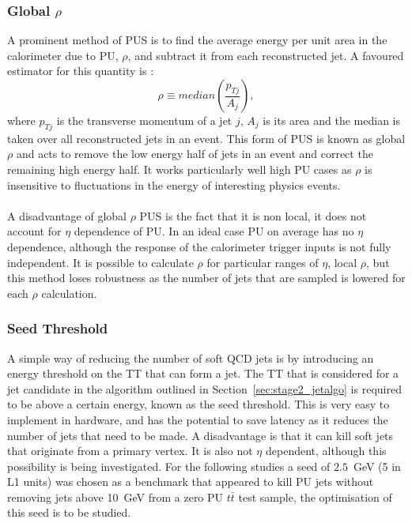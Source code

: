 \subsubsection{Global \boldmath $\rho$}
A prominent method of PUS is to find the average energy per unit area in the calorimeter due to PU, $\rho$, and subtract it from each reconstructed jet. A favoured estimator for this quantity is \cite{global_rho}:
\begin{equation}
\rho\equiv median(\frac{p_{Tj}}{A_j}),
\end{equation}
where $p_{Tj}$ is the transverse momentum of a jet $j$, $A_j$ is its area and the median is taken over all reconstructed jets in an event. This form of PUS is known as global $\rho$ and acts to remove the low energy half of jets in an event and correct the remaining high energy half. It works particularly well high PU cases as $\rho$ is insensitive to fluctuations in the energy of interesting physics events. 
\\\\
A disadvantage of global $\rho$ PUS is the fact that it is non local, it does not account for $\eta$ dependence of PU. In an ideal case PU on average has no $\eta$ dependence, although the response of the calorimeter trigger inputs is not fully independent. It is possible to calculate $\rho$ for particular ranges of $\eta$, local $\rho$, but this method loses robustness as the number of jets that are sampled is lowered for each $\rho$ calculation. 

\subsubsection{Seed Threshold}
A simple way of reducing the number of soft QCD jets is by introducing an energy threshold on the TT that can form a jet. The TT that is considered for a jet candidate in the algorithm outlined in Section~\ref{sec:stage2_jetalgo} is required to be above a certain energy, known as the seed threshold. This is very easy to implement in hardware, and has the potential to save latency as it reduces the number of jets that need to be made. A disadvantage is that it can kill soft jets that originate from a primary vertex. It is also not $\eta$ dependent, although this possibility is being investigated. For the following studies a seed of $2.5$~GeV (5 in L1 units) was chosen as a benchmark that appeared to kill PU jets without removing jets above 10~GeV from a zero PU $t\bar{t}$ test sample, the optimisation of this seed is to be studied. 

